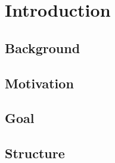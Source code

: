 %
%
%
\chapter{Introduction}
\label{c:intro}

%
%
\section{Background}

%
%
\section{Motivation}

%
%
\section{Goal}

%
%
\section{Structure}
